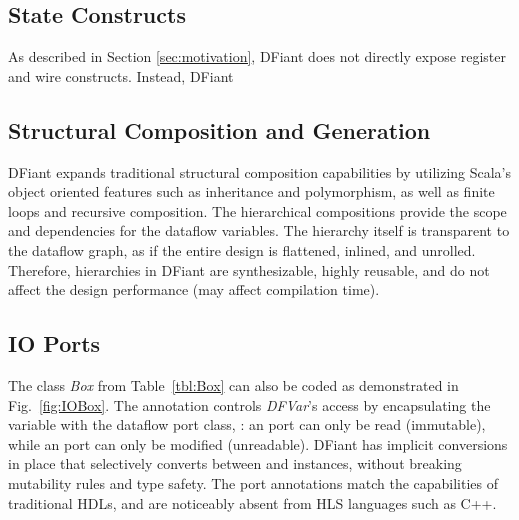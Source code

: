 \subsection{State Constructs}
As described in Section \ref{sec:motivation}, DFiant does not directly expose register and wire constructs. Instead, DFiant 



\subsection{Structural Composition and Generation}
DFiant expands traditional structural composition capabilities by utilizing Scala's object oriented features such as inheritance and polymorphism, as well as finite loops and recursive composition. The hierarchical compositions provide the scope and dependencies for the dataflow variables. The hierarchy itself is transparent to the dataflow graph, as if the entire design is flattened, inlined, and unrolled. Therefore, hierarchies in DFiant are synthesizable, highly reusable, and do not affect the design performance (may affect compilation time).

%

\subsection{IO Ports}
\label{sec:io_ports}
The class \textit{Box} from Table~\ref{tbl:Box} can also be coded as demonstrated in Fig.~\ref{fig:IOBox}. The annotation  controls \textit{DFVar}'s access by encapsulating the variable with the dataflow port class, : an  port can only be read (immutable), while an  port can only be modified (unreadable). DFiant has implicit conversions in place that selectively converts between  and  instances, without breaking mutability rules and type safety. The port annotations match the capabilities of traditional HDLs, and are noticeably absent from HLS languages such as C++. 




